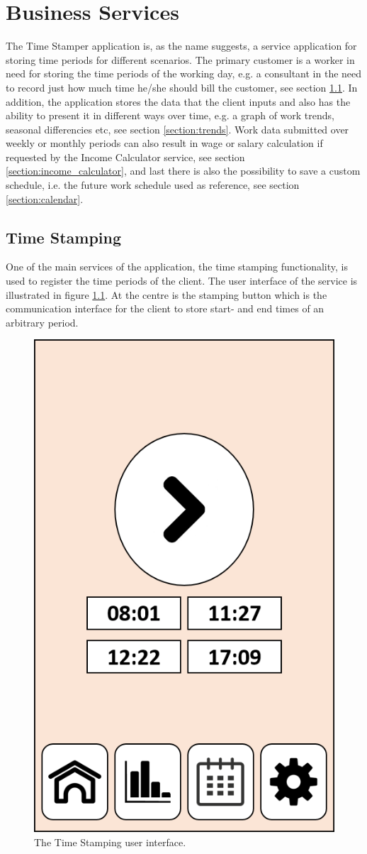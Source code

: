 \documentclass{report}
\begin{document}
\chapter{Business Services}
The Time Stamper application is, as the name suggests, a service application for storing time periods for different scenarios. The primary customer is a worker in need for storing the time periods of the working day, e.g. a consultant in the need to record just how much time he/she should bill the customer, see section \ref{section:time_stamping}. In addition, the application stores the data that the client inputs and also has the ability to present it in different ways over time, e.g. a graph of work trends, seasonal differencies etc, see section \ref{section:trends}. Work data submitted over weekly or monthly periods can also result in wage or salary calculation if requested by the Income Calculator service, see section \ref{section:income_calculator}, and last there is also the possibility to save a custom schedule, i.e. the future work schedule used as reference, see section \ref{section:calendar}.

\section{Time Stamping}
\label{section:time_stamping}
One of the main services of the application, the time stamping functionality, is used to register the time periods of the client. The user interface of the service is illustrated in figure \ref{figure:time_stamping_activity}. At the centre is the stamping button which is the communication interface for the client to store start- and end times of an arbitrary period.

\begin{figure}
\centering
\includegraphics[width=0.3\linewidth]{time_stamping_activity.png}
\caption{The Time Stamping user interface.}
\label{figure:time_stamping_activity}
\end{figure}
\end{document}
